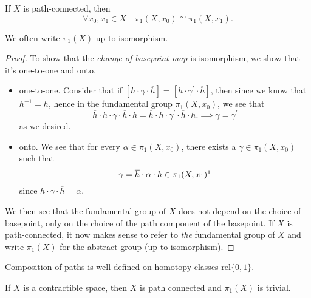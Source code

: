 \begin{theorem}
	If \(X\) is path-connected, then
	\[
		\forall x_0, x_1\in X\quad \pi_1(X, x_0)\cong \pi _1(X, x_1).
	\]
\end{theorem}
\begin{remark}
	We often write \(\pi _1(X)\) up to isomorphism.
\end{remark}
\begin{proof}
	\par To show that the \emph{change-of-basepoint map} is isomorphism, we show that it's one-to-one and onto.
	\begin{itemize}
		\item one-to-one. Consider that if \([h\cdot \gamma\cdot \overline{h} ] = [h\cdot \gamma ^\prime \cdot \overline{h} ]\), then since we know that \(h^{-1}  = \overline{h} \), hence
		      in the fundamental group \(\pi _1(X, x_0)\), we see that
		      \[
			      \overline{h} \cdot h\cdot \gamma\cdot \overline{h} \cdot h = \overline{h} \cdot h\cdot \gamma ^\prime \cdot \overline{h} \cdot h. \implies \gamma = \gamma ^\prime
		      \]
		      as we desired.
		\item onto. We see that for every \(\alpha \in \pi_1(X, x_0)\), there exists a \(\gamma\in \pi_1(X, x_{0})\) such that
		      \[
			      \gamma = \overline{h} \cdot \alpha \cdot h\in \pi _1(X, x_1)\footnotemark
		      \]
		      since \(h\cdot \gamma\cdot \overline{h} =\alpha \).
	\end{itemize}

	\par We then see that the fundamental group of \(X\) does not depend on the choice of basepoint, only on the choice of the path component of the basepoint.
	If \(X\) is path-connected, it now makes sense to refer to \emph{the} fundamental group of \(X\) and write \(\pi _1(X)\) for the abstract group (up to isomorphism).

\end{proof}

\begin{exercise}
	Composition of paths is well-defined on homotopy classes \(\mathrm{rel} \{0, 1\}\).
\end{exercise}

\begin{exercise}
	If \(X\) is a contractible space, then \(X\) is path connected and \(\pi _1(X)\)  is trivial.
\end{exercise}